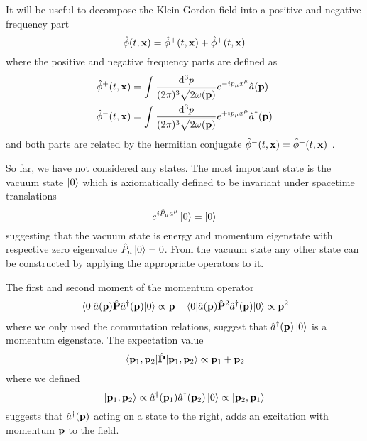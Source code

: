 \begin{definition}
	It will be useful to decompose the Klein-Gordon field into a positive and negative frequency part
	\begin{equation}
		\hat\phi(t,\vb{x})
		=
		\hat\phi^+(t,\vb{x})
		+
		\hat\phi^+(t,\vb{x})
	\end{equation}
	where the positive and negative frequency parts are defined as~\cite[p.~26]{Peskin1995}
	\begin{align}
		\hat\phi^+(t,\vb{x})
		&=
		\int\frac{\dd[3]{p}}{(2\pi)^3\sqrt{2\omega(\vb{p})}}
		e^{-ip_\mu x^\mu}
		\hat{a}(\vb{p})
		\\
		\hat\phi^-(t,\vb{x})
		&=
		\int\frac{\dd[3]{p}}{(2\pi)^3\sqrt{2\omega(\vb{p})}}
		e^{+ip_\mu x^\mu}
		\hat{a}^\dagger(\vb{p})
	\end{align}
	and both parts are related by the hermitian conjugate $\hat\phi^-(t,\vb{x})=\hat\phi^+(t,\vb{x})^\dagger$.
\end{definition}

So far, we have not considered any states.
The most important state is the vacuum state $\ket{0}$ which is axiomatically defined to be invariant under spacetime translations~\cite[p.~276]{Bogolubov1989}
\begin{equation}
	e^{i\hat{P}_\mu a^\mu}
	\ket{0}
	=
	\ket{0}
\end{equation}
suggesting that the vacuum state is energy and momentum eigenstate with respective zero eigenvalue $\hat{P}_\mu\ket{0}=0$.
From the vacuum state any other state can be constructed by applying the appropriate operators to it.

The first and second moment of the momentum operator
\begin{align}
	\expval{\hat{a}(\vb{p})\hat{\vb{P}}\hat{a}^\dagger(\vb{p})}{0}
	\propto
	\vb{p}
	&&
	\expval{\hat{a}(\vb{p})\hat{\vb{P}}^2\hat{a}^\dagger(\vb{p})}{0}
	\propto
	\vb{p}^2
\end{align}
where we only used the commutation relations, suggest that $\hat{a}^\dagger(\vb{p})\ket{0}$ is a momentum eigenstate.
The expectation value
\begin{equation}
	\expval{\hat{\vb{P}}}{\vb{p}_1,\vb{p}_2}
	\propto
	\vb{p}_1+\vb{p}_2
\end{equation}
where we defined
\begin{equation}
	\ket{\vb{p}_1,\vb{p}_2}
	\propto
	\hat{a}^\dagger(\vb{p}_1)
	\hat{a}^\dagger(\vb{p}_2)
	\ket{0}
	\propto
	\ket{\vb{p}_2,\vb{p}_1}
\end{equation}
suggests that $\hat{a}^\dagger(\vb{p})$ acting on a state to the right, adds an excitation with momentum $\vb{p}$ to the field.

